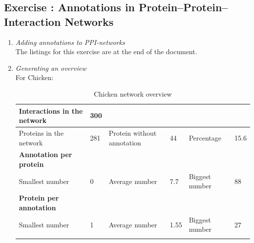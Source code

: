\documentclass[10pt,a4paper]{article}
\newcommand{\exercise}[1]
{
  \stepcounter{subsection}
  \subsection*{Exercise \thesubsection: #1}

}
\begin{document}
\newpage
\exercise{Annotations in Protein–Protein–Interaction Networks}
\begin{enumerate}
	
	\item \textit{Adding annotations to PPI-networks}\\
	
		The listings for this exercise are at the end of the document.


	\item \textit{Generating an overview}\\
	
	
	
	
	
	
	For Chicken: 
	
	\begin{table}[H]
		\centering
		\caption{Chicken network overview}
		\vspace*{1mm}
		\label{chickentableoverview}
		\begin{tabular}{llllll}
			\hline
			\multicolumn{1}{|l|}{Interactions in the network}     & \multicolumn{1}{l|}{300} & \multicolumn{1}{l|}{}                           & \multicolumn{1}{l|}{}    & \multicolumn{1}{l|}{}               & \multicolumn{1}{l|}{}     \\ \hline
			\multicolumn{1}{|l|}{Proteins in the network}         & \multicolumn{1}{l|}{281} & \multicolumn{1}{l|}{Protein without annotation} & \multicolumn{1}{l|}{44}  & \multicolumn{1}{l|}{Percentage}     & \multicolumn{1}{l|}{15.6} \\ \hline
			\multicolumn{1}{|l|}{\textbf{Annotation per protein}} & \multicolumn{1}{l|}{}    & \multicolumn{1}{l|}{}                           & \multicolumn{1}{l|}{}    & \multicolumn{1}{l|}{}               & \multicolumn{1}{l|}{}     \\ \hline
			\multicolumn{1}{|l|}{Smallest number}                 & \multicolumn{1}{l|}{0}   & \multicolumn{1}{l|}{Average number}             & \multicolumn{1}{l|}{7.7} & \multicolumn{1}{l|}{Biggest number} & \multicolumn{1}{l|}{88}   \\ \hline
			\multicolumn{1}{|l|}{\textbf{Protein per annotation}} & \multicolumn{1}{l|}{}    & \multicolumn{1}{l|}{}                           & \multicolumn{1}{l|}{}    & \multicolumn{1}{l|}{}               & \multicolumn{1}{l|}{}     \\ \hline
			\multicolumn{1}{|l|}{Smallest number}                 & \multicolumn{1}{l|}{1}   & \multicolumn{1}{l|}{Average number}             & \multicolumn{1}{l|}{1.55} & \multicolumn{1}{l|}{Biggest number} & \multicolumn{1}{l|}{27}  \\ \hline
			&                          &                                                 &                          &                                     &                          
		\end{tabular}
	\end{table}


\end{enumerate}
\end{document}
